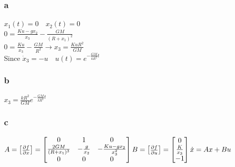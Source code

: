 \documentclass{article}
\begin{document}
\subsubsection*{a}
$x_1(t)=0 \quad x_2(t)=0$ \\
$0=\frac{Ku-gx_2}{x_3}-\frac{GM}{(R+x_1)^2}$\\
$0=\frac{Ku}{x_3}-\frac{GM}{R^2}\rightarrow x_3=\frac{KuR^2}{GM}$\\
Since $\dot{x}_3=-u \quad u(t)=e^{-\frac{GM}{kR^2}t}$
\subsubsection*{b}
$x_3=\frac{kR^2}{GM}e^{-\frac{GM}{kR^2}t}$
\subsubsection*{c}
$A=\begin{bmatrix}
    \frac{\partial{f}}{\partial x}
\end{bmatrix}
=\begin{bmatrix}
    0 & 1 & 0\\
    \frac{2GM}{(R+x_1)^3} & -\frac{g}{x_2} & -\frac{Ku-gx_2}{x_3^2}\\
    0 & 0 & 0
\end{bmatrix}\\
B=\begin{bmatrix}
    \frac{\partial{f}}{\partial u}
\end{bmatrix}
=\begin{bmatrix}
    0 \\
    \frac{K}{x_3} \\
    -1
\end{bmatrix}\\
\dot{x}=Ax+Bu$
\end{document}
